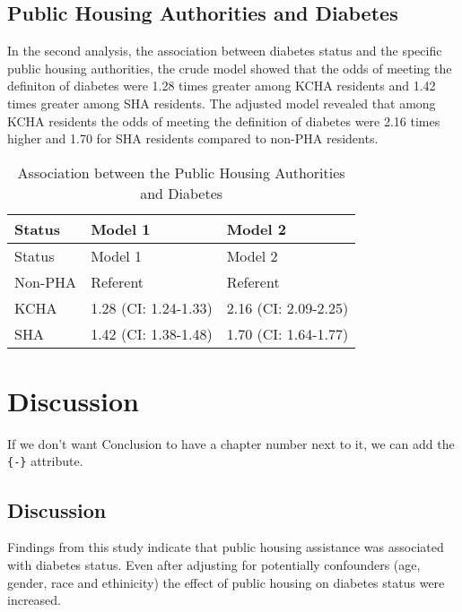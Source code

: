 \documentclass [11pt, proquest] {uwthesis}[2015/03/03]
\begin{document}
\section{Public Housing Authorities and
Diabetes}\label{public-housing-authorities-and-diabetes}

In the second analysis, the association between diabetes status and the
specific public housing authorities, the crude model showed that the
odds of meeting the definiton of diabetes were 1.28 times greater among
KCHA residents and 1.42 times greater among SHA residents. The adjusted
model revealed that among KCHA residents the odds of meeting the
definition of diabetes were 2.16 times higher and 1.70 for SHA residents
compared to non-PHA residents.
\begin{longtable}[]{@{}lll@{}}
\caption{\label{tab:inher} Association between the Public Housing
Authorities and Diabetes}\tabularnewline
\toprule
Status & Model 1 & Model 2\tabularnewline
\midrule
\endfirsthead
\toprule
Status & Model 1 & Model 2\tabularnewline
\midrule
\endhead
Non-PHA & Referent & Referent\tabularnewline
KCHA & 1.28 (CI: 1.24-1.33) & 2.16 (CI: 2.09-2.25)\tabularnewline
SHA & 1.42 (CI: 1.38-1.48) & 1.70 (CI: 1.64-1.77)\tabularnewline
\bottomrule
\end{longtable}
\chapter*{Discussion}\label{discussion}

If we don't want Conclusion to have a chapter number next to it, we can
add the \texttt{\{-\}} attribute.

\section{Discussion}\label{discussion-1}

Findings from this study indicate that public housing assistance was
associated with diabetes status. Even after adjusting for potentially
confounders (age, gender, race and ethinicity) the effect of public
housing on diabetes status were increased.
\end{document}

